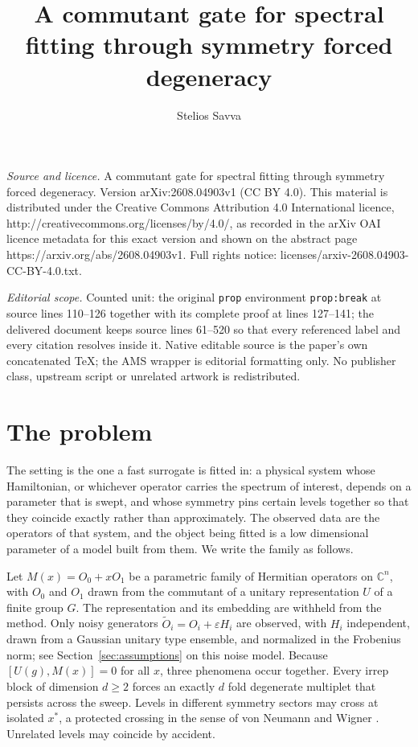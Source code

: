 \documentclass[10pt,a4paper]{amsart}
\newcommand{\comm}[2]{[#1,#2]}
\begin{document}
\title[A commutant gate for spectral fitting through symmetry force]{A commutant gate for spectral fitting through symmetry forced degeneracy}
\author{Stelios Savva}
\date{}
\maketitle
\noindent\emph{Source and licence.} A commutant gate for spectral fitting through symmetry forced degeneracy. Version arXiv:2608.04903v1 (CC BY 4.0). This material is distributed under the Creative Commons Attribution 4.0 International licence, http://creativecommons.org/licenses/by/4.0/, as recorded in the arXiv OAI licence metadata for this exact version and shown on the abstract page https://arxiv.org/abs/2608.04903v1. Full rights notice: licenses/arxiv-2608.04903-CC-BY-4.0.txt.\par\smallskip
\noindent\textit{Editorial scope.} Counted unit: the original \texttt{prop} environment \texttt{prop:break} at source lines 110--126 together with its complete proof at lines 127--141; the delivered document keeps source lines 61--520 so that every referenced label and every citation resolves inside it. Native editable source is the paper's own concatenated TeX; the AMS wrapper is editorial formatting only. No publisher class, upstream script or unrelated artwork is redistributed.
\section{The problem}
The setting is the one a fast surrogate is fitted in: a physical system whose
Hamiltonian, or whichever operator carries the spectrum of interest, depends on
a parameter that is swept, and whose symmetry pins certain levels together so
that they coincide exactly rather than approximately. The observed data are the
operators of that system, and the object being fitted is a low dimensional
parameter of a model built from them. We write the family as follows.

Let $M(x)=O_0+xO_1$ be a parametric family of Hermitian operators on
$\mathbb{C}^n$, with $O_0$ and $O_1$ drawn from the commutant of a unitary
representation $U$ of a finite group $G$. The representation and its embedding
are withheld from the method. Only noisy generators
$\tilde O_i=O_i+\varepsilon H_i$ are observed, with $H_i$ independent, drawn from
a Gaussian unitary type ensemble, and normalized in the Frobenius norm; see
Section~\ref{sec:assumptions} on this noise model. Because
$\comm{U(g)}{M(x)}=0$ for all $x$, three phenomena occur together. Every irrep
block of dimension $d\ge2$ forces an exactly $d$ fold degenerate multiplet that
persists across the sweep. Levels in different symmetry sectors may cross at
isolated $x^\ast$, a protected crossing in the sense of von Neumann and Wigner
\cite{vNW1929}. Unrelated levels may coincide by accident.
\end{document}
